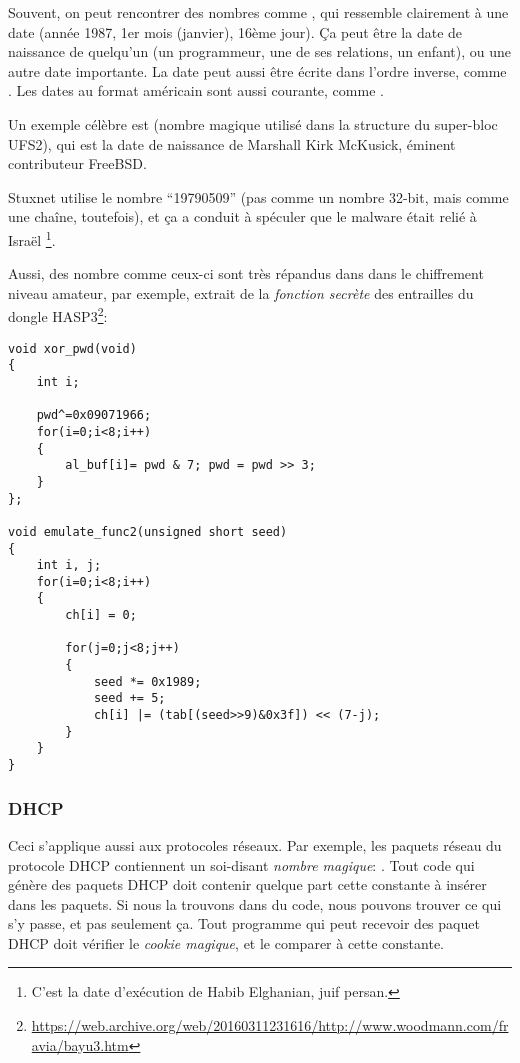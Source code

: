 
Souvent, on peut rencontrer des nombres comme , qui ressemble clairement
à une date (année 1987, 1er mois (janvier), 16ème jour).
Ça peut être la date de naissance de quelqu'un (un programmeur, une de ses relations,
un enfant), ou une autre date importante.
La date peut aussi être écrite dans l'ordre inverse, comme .
Les dates au format américain sont aussi courante, comme .

Un exemple célèbre est  (nombre magique utilisé dans la structure
du super-bloc UFS2), qui est la date de naissance de Marshall Kirk McKusick, éminent
contributeur FreeBSD.

Stuxnet utilise le nombre ``19790509'' (pas comme un nombre 32-bit, mais comme une
chaîne, toutefois), et ça a conduit à spéculer que le malware était relié à Israël%
\footnote{C'est la date d'exécution de Habib Elghanian, juif persan.}.

Aussi, des nombre comme ceux-ci sont très répandus dans dans le chiffrement niveau
amateur, par exemple, extrait de la \emph{fonction secrète} des entrailles du dongle
HASP3\footnote{\url{https://web.archive.org/web/20160311231616/http://www.woodmann.com/fravia/bayu3.htm}}:

\begin{lstlisting}[style=customc]
void xor_pwd(void) 
{ 
	int i; 
	
	pwd^=0x09071966;
	for(i=0;i<8;i++) 
	{ 
		al_buf[i]= pwd & 7; pwd = pwd >> 3; 
	} 
};

void emulate_func2(unsigned short seed)
{ 
	int i, j; 
	for(i=0;i<8;i++) 
	{ 
		ch[i] = 0; 
		
		for(j=0;j<8;j++)
		{ 
			seed *= 0x1989; 
			seed += 5; 
			ch[i] |= (tab[(seed>>9)&0x3f]) << (7-j); 
		}
	} 
}
\end{lstlisting}

\subsubsection{DHCP}

Ceci s'applique aussi aux protocoles réseaux.
Par exemple, les paquets réseau du protocole DHCP contiennent un soi-disant \emph{nombre
magique}: .
Tout code qui génère des paquets DHCP doit contenir quelque part cette constante
à insérer dans les paquets.
Si nous la trouvons dans du code, nous pouvons trouver ce qui s'y passe, et pas seulement ça.
Tout programme qui peut recevoir des paquet DHCP doit vérifier le \emph{cookie magique},
et le comparer à cette constante.


